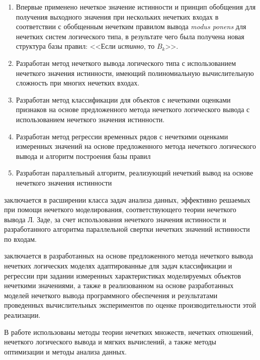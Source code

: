 {\novelty}
\begin{enumerate}[beginpenalty=10000] %
	\item Впервые применено нечеткое значение истинности и принцип обобщения для получения выходного значения при нескольких нечетких входах в соответствии с обобщенным нечетким правилом вывода \textit{modus ponens} для нечетких систем логического типа, в результате чего была получена новая структура базы правил: <<Если \textit{истинно}, то $B_k$>>.
	\item Разработан метод нечеткого вывода логического типа с использованием нечеткого значения истинности, имеющий полиномиальную вычислительную сложность при многих нечетких входах.
	\item Разработан метод классификации для объектов с нечеткими оценками признаков на основе предложенного метода нечеткого логического вывода с использованием нечеткого значения истинности.
	\item Разработан метод регрессии временных рядов с нечеткими оценками измеренных значений на основе предложенного метода нечеткого логического вывода и алгоритм построения базы правил %
	\item Разработан параллельный алгоритм, реализующий нечеткий вывод на основе нечеткого значения истинности %
\end{enumerate}

{\theoreticalValue} заключается в расширении класса задач анализа данных, эффективно решаемых при помощи нечеткого моделирования, соответствующего теории нечеткого вывода Л. Заде, за счет использования нечеткого значения истинности и разработанного алгоритма параллельной свертки нечетких значений истинности по входам.

{\practicalValue} заключается в разработанных на основе предложенного метода нечеткого вывода нечетких логических моделях адаптированные для задач классификации и регрессии при задании измеренных характеристиках моделируемых объектов нечеткими значениями, а также в реализованном на основе разработанных моделей нечеткого вывода программного обеспечения и результатами проведенных вычислительных экспериментов по оценке производительности этой реализации.

{\methods} В работе использованы методы теории нечетких множеств, нечетких отношений, нечеткого логического вывода и мягких вычислений, а также методы оптимизации и методы анализа данных.

